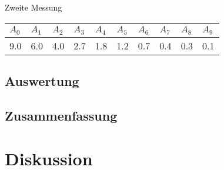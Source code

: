 \documentclass[12pt,a4paper]{article}
\begin{document}
Zweite Messung

\vspace{3pt}
\begin{tabular}{|l|l|l|l|l|l|l|l|l|l|}
\hline
$A_{0}$&$A_{1}$&$A_{2}$&$A_{3}$&$A_{4}$&$A_{5}$&$A_{6}$&$A_{7}$&$A_{8}$&$A_{9}$\\
\hline
9.0&6.0&4.0&2.7&1.8&1.2&0.7&0.4&0.3&0.1\\
\hline
\end{tabular}

\subsection*{Auswertung}

\subsection*{Zusammenfassung}


\section*{Diskussion}
\end{document}
